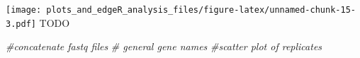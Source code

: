\documentclass[]{article}
\newenvironment{Shaded}{\begin{snugshade}}{\end{snugshade}}
\newcommand{\KeywordTok}[1]{\textcolor[rgb]{0.13,0.29,0.53}{\textbf{#1}}}
\newcommand{\DataTypeTok}[1]{\textcolor[rgb]{0.13,0.29,0.53}{#1}}
\newcommand{\CommentTok}[1]{\textcolor[rgb]{0.56,0.35,0.01}{\textit{#1}}}
\newcommand{\OperatorTok}[1]{\textcolor[rgb]{0.81,0.36,0.00}{\textbf{#1}}}
\newcommand{\NormalTok}[1]{#1}
\begin{document}
\begin{Shaded}
\end{Shaded}

\texttt{[image: plots\_and\_edgeR\_analysis\_files/figure-latex/unnamed-chunk-15-3.pdf]}
TODO

\begin{Shaded}
\begin{Highlighting}[]
\CommentTok{#concatenate fastq files }
\CommentTok{# general gene names}
\CommentTok{#scatter plot of replicates}
\end{Highlighting}
\end{Shaded}
\end{document}
